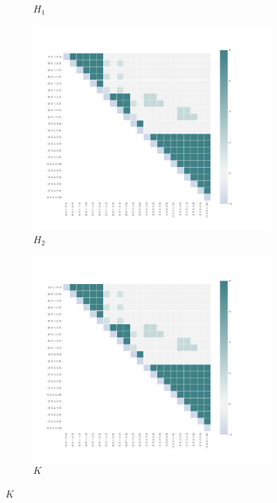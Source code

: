 \begin{figure}[H]
\begin{subfigure}[b]{0.2\textwidth}
            \caption[]%
            {{\small $H_{1}$}}    
            \label{fig:h1}
        \end{subfigure}
         \hfill
        \begin{subfigure}[b]{0.2\textwidth}
            \centering
            \includegraphics[trim={4.3cm 4.1cm 8.4cm 4.1cm}, clip,width=\textwidth]{images/QUBO_h2.png}
            \caption[]%
            {{\small $H_{2}$}}    
            \label{fig:h2}
        \end{subfigure}
        \hfill
        \begin{subfigure}[b]{0.2\textwidth}
            \centering 
            \includegraphics[trim={4.3cm 4.1cm 8.4cm 4.1cm}, clip,width=\textwidth]{images/QUBO_h3.png}
            \caption[]%
            {{\small $K$}}    
            \label{fig:h3}
        \end{subfigure}


\end{figure}
